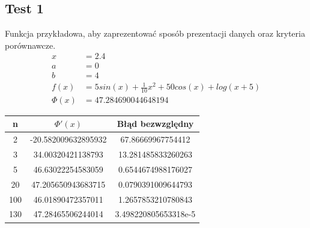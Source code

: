 \documentclass[a4paper]{article}
\begin{document}
\newpage
\subsection{Test 1}
    Funkcja przykładowa, aby zaprezentować sposób prezentacji danych oraz kryteria porównawcze.
    \[
        \begin{aligned}
            x &= 2.4 \\
            a &= 0 \\
            b &= 4 \\
            f(x) &= 5sin(x) + \frac{1}{10}x^2 + 50cos(x) + log(x + 5) \\
            \Phi(x) &= 47.284690044648194
        \end{aligned}
    \]

    \begin{center}
        \begin{tabular}{|c|c|c|} 
            \hline
            n & $\Phi'(x)$ & Błąd bezwzględny \\
            \hline
            2 & -20.582009632895932 & 67.86669967754412 \\
            \hline
            3 & 34.00320421138793 & 13.281485833260263 \\
            \hline
            5 & 46.63022254583059 & 0.6544674988176027 \\
            \hline
            20 & 47.205650943683715 & 0.0790391009644793\\
            \hline
            100 & 46.01890472357011 & 1.2657853210780843 \\
            \hline
            130 & 47.28465506244014 & 3.498220805653318e-5 \\
            \hline
        \end{tabular}
    \end{center}
\end{document}
